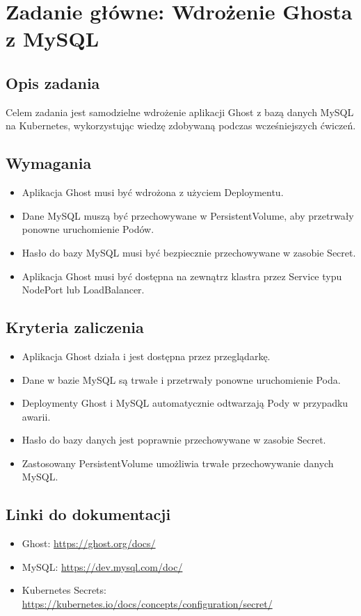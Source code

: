 \documentclass{article}
\begin{document}
\section{Zadanie główne: Wdrożenie Ghosta z MySQL}
\subsection{Opis zadania}
Celem zadania jest samodzielne wdrożenie aplikacji Ghost z bazą danych MySQL na Kubernetes, wykorzystując wiedzę zdobywaną podczas wcześniejszych ćwiczeń.

\subsection{Wymagania}
\begin{itemize}
  \item Aplikacja Ghost musi być wdrożona z użyciem Deploymentu.
  \item Dane MySQL muszą być przechowywane w PersistentVolume, aby przetrwały ponowne uruchomienie Podów.
  \item Hasło do bazy MySQL musi być bezpiecznie przechowywane w zasobie Secret.
  \item Aplikacja Ghost musi być dostępna na zewnątrz klastra przez Service typu NodePort lub LoadBalancer.
\end{itemize}

\subsection{Kryteria zaliczenia}
\begin{itemize}
  \item Aplikacja Ghost działa i jest dostępna przez przeglądarkę.
  \item Dane w bazie MySQL są trwałe i przetrwały ponowne uruchomienie Poda.
  \item Deploymenty Ghost i MySQL automatycznie odtwarzają Pody w przypadku awarii.
  \item Hasło do bazy danych jest poprawnie przechowywane w zasobie Secret.
  \item Zastosowany PersistentVolume umożliwia trwałe przechowywanie danych MySQL.
\end{itemize}

\subsection{Linki do dokumentacji}
\begin{itemize}
  \item Ghost: \url{https://ghost.org/docs/}
  \item MySQL: \url{https://dev.mysql.com/doc/}
  \item Kubernetes Secrets: \url{https://kubernetes.io/docs/concepts/configuration/secret/}
\end{itemize}
\end{document}

